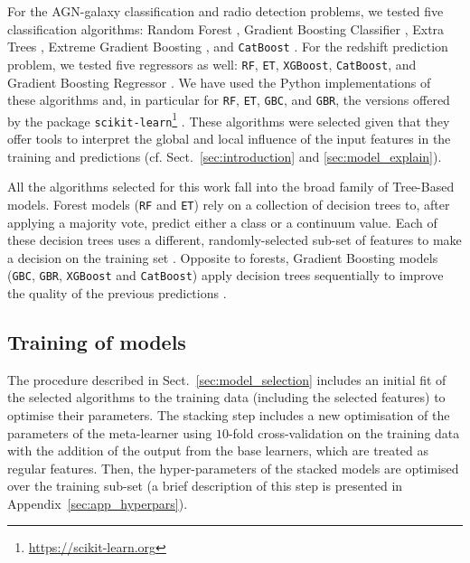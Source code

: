\documentclass{aa}
\begin{document}
For the AGN-galaxy classification and radio detection problems, we tested five classification algorithms: Random Forest \citep[\texttt{RF};][]{Breiman2001}, Gradient Boosting Classifier \citep[\texttt{GBC};][]{10.1214/aos/1013203451}, Extra Trees \citep[\texttt{ET};][]{Geurts2006}, Extreme Gradient Boosting \citep[\texttt{XGBoost}, \texttt{v1.5.1};][]{Chen:2016:XST:2939672.2939785}, and \texttt{CatBoost} \citep[\texttt{v1.0.5};][]{DBLP:journals/corr/DorogushGGKPV17, DBLP:journals/corr/abs-1810-11363}.
For the redshift prediction problem, we tested five regressors as well: \texttt{RF}, \texttt{ET}, \texttt{XGBoost}, \texttt{CatBoost}, and Gradient Boosting Regressor \citep[\texttt{GBR};][]{10.1214/aos/1013203451}.
We have used the Python implementations of these algorithms and, in particular for \texttt{RF}, \texttt{ET}, \texttt{GBC}, and \texttt{GBR}, the versions offered by the package \texttt{scikit-learn}\footnote{\url{https://scikit-learn.org}} \citep[\texttt{v0.23.2};][]{scikit-learn}. These algorithms were selected given that they offer tools to interpret the global and local influence of the input features in the training and predictions (cf. Sect.~\ref{sec:introduction} and \ref{sec:model_explain}).

All the algorithms selected for this work fall into the broad family of Tree-Based models. Forest models (\texttt{RF} and \texttt{ET}) rely on a collection of decision trees to, after applying a majority vote, predict either a class or a continuum value. Each of these decision trees uses a different, randomly-selected sub-set of features to make a decision on the training set \citep{Breiman2001}. Opposite to forests, Gradient Boosting models (\texttt{GBC}, \texttt{GBR}, \texttt{XGBoost} and \texttt{CatBoost}) apply decision trees sequentially to improve the quality of the previous predictions \citep{10.1214/aos/1013203451, FRIEDMAN2002367}.

\subsection{Training of models}\label{sec:models_training}

The procedure described in Sect.~\ref{sec:model_selection} includes an initial fit of the selected algorithms to the training data (including the selected features) to optimise their parameters. The stacking step includes a new optimisation of the parameters of the meta-learner using $10$-fold cross-validation on the training data with the addition of the output from the base learners, which are treated as regular features. Then, the hyper-parameters of the stacked models are optimised over the training sub-set (a brief description of this step is presented in Appendix~\ref{sec:app_hyperpars}).
\end{document}
